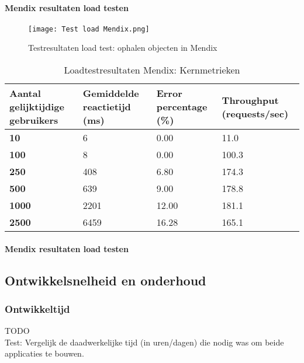 \paragraph{Mendix resultaten load testen}

\begin{figure}[H]
    \centering
    \texttt{[image: Test load Mendix.png]}
    \caption[\centering Testresultaten load test: ophalen objecten in Mendix]{\label{fig:loadtest-Mendix} Testresultaten load test: ophalen objecten in Mendix}
\end{figure}


\begin{table}[h]
    \centering
    \begin{tabular}{ |p{5cm}|p{3cm}|p{3cm}|p{3cm}|}
        \hline
        \textbf{Aantal gelijktijdige \newline gebruikers} & \textbf{Gemiddelde reactietijd (ms)} & \textbf{Error \newline percentage (\%)} & \textbf{Throughput (requests/sec)}\\
        \hline
        \textbf{10}  & 6 & 0.00 & 11.0 \\
        \hline
        \textbf{100} & 8 & 0.00 & 100.3 \\
        \hline
        \textbf{250}  & 408 & 6.80 & 174.3 \\
        \hline
        \textbf{500}  & 639 & 9.00 & 178.8 \\
        \hline                       
        \textbf{1000}  & 2201 & 12.00 & 181.1  \\
        \hline
        \textbf{2500}  & 6459 & 16.28 & 165.1 \\
        \hline
    \end{tabular}
    \caption[\centering Loadtestresultaten Mendix: Kernmetrieken]{\label{tab:Testresultaten Mendix loadtest}Loadtestresultaten Mendix: Kernmetrieken}
\end{table}



\paragraph{Mendix resultaten load testen}

\subsection{Ontwikkelsnelheid en onderhoud}

\subsubsection{Ontwikkeltijd}
TODO
\\
Test: Vergelijk de daadwerkelijke tijd (in uren/dagen) die nodig was om beide applicaties te bouwen.

